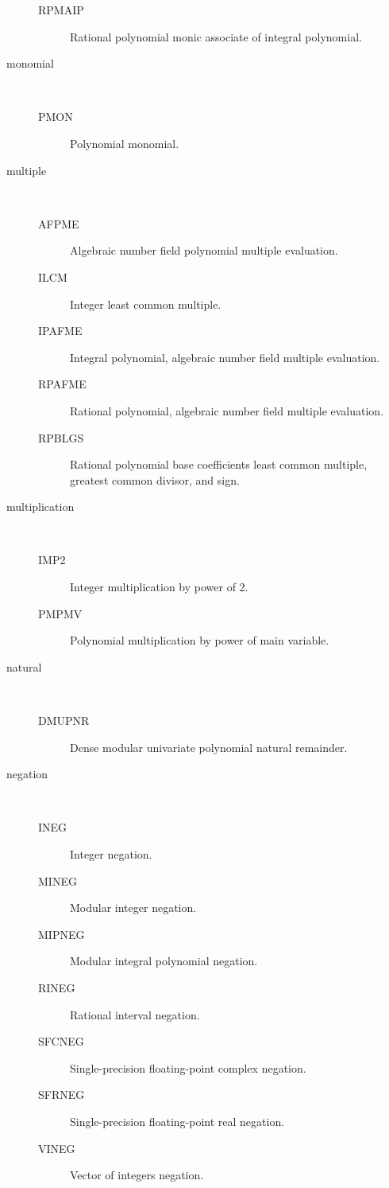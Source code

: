 \begin{description}
\begin{description}
  \item[RPMAIP]  Rational polynomial monic associate of integral polynomial.
  \end{description}
\item[monomial] \ \ 
  \begin{description}
  \item[PMON]  Polynomial monomial.
  \end{description}
\item[multiple] \ \ 
  \begin{description}
  \item[AFPME]  Algebraic number field polynomial multiple evaluation.
  \item[ILCM]  Integer least common multiple.
  \item[IPAFME]  Integral polynomial, algebraic number field multiple
    evaluation.
  \item[RPAFME]  Rational polynomial, algebraic number field multiple
    evaluation.
  \item[RPBLGS]  Rational polynomial base coefficients least common multiple,
    greatest common divisor, and sign.
  \end{description}
\item[multiplication] \ \ 
  \begin{description}
  \item[IMP2]  Integer multiplication by power of 2.
  \item[PMPMV]  Polynomial multiplication by power of main variable.
  \end{description}
\item[natural] \ \ 
  \begin{description}
  \item[DMUPNR]  Dense modular univariate polynomial natural remainder.
  \end{description}
\item[negation] \ \ 
  \begin{description}
  \item[INEG]  Integer negation.
  \item[MINEG]  Modular integer negation.
  \item[MIPNEG]  Modular integral polynomial negation.
  \item[RINEG]  Rational interval negation.
  \item[SFCNEG]  Single-precision floating-point complex negation.
  \item[SFRNEG]  Single-precision floating-point real negation.
  \item[VINEG]  Vector of integers negation.

\end{description}
\end{description}
